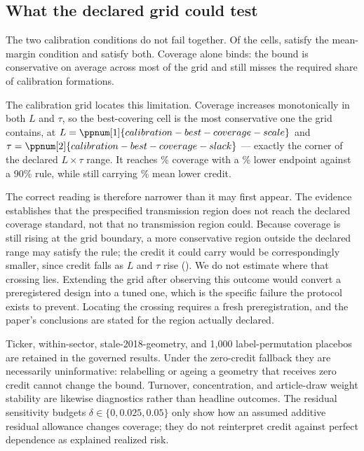 \subsection{What the declared grid could test}\label{sec:calibration-boundary}

The two calibration conditions do not fail together.  Of the
 cells,
 satisfy the mean-margin condition and
 satisfy both.  Coverage alone binds: the
bound is conservative on average across most of the grid and still misses the
required share of calibration formations.

The calibration grid locates this limitation. Coverage
increases monotonically in both $L$ and $\tau$, so the best-covering cell is the
most conservative one the grid contains, at
$L=\ppnum[1]{calibration-best-coverage-scale}$ and
$\tau=\ppnum[2]{calibration-best-coverage-slack}$ --- exactly the corner of the
declared $L\times\tau$ range.  It reaches
\% coverage with a
\% lower endpoint against a 90\%
rule, while still carrying
\% mean lower credit.

The correct reading is therefore narrower than it may first appear.  The
evidence establishes that the prespecified transmission region does not reach
the declared coverage standard, not that no transmission region could.  Because
coverage is still rising at the grid boundary, a more conservative region
outside the declared range may satisfy the rule; the credit it could carry would
be correspondingly smaller, since credit falls as $L$ and $\tau$ rise
(). We do not estimate where
that crossing lies.
Extending the grid after observing this outcome would convert a preregistered
design into a tuned one, which is the specific failure the protocol exists to
prevent.  Locating the crossing requires a fresh preregistration, and the
paper's conclusions are stated for the region actually declared.

Ticker, within-sector, stale-2018-geometry, and 1,000 label-permutation placebos
are retained in the governed results.  Under the zero-credit fallback they are
necessarily uninformative: relabelling or ageing a geometry that receives zero
credit cannot change the bound.  Turnover, concentration, and article-draw
weight stability are likewise diagnostics rather than headline outcomes.  The
residual sensitivity budgets $\delta\in\{0,0.025,0.05\}$ only show how an
assumed additive residual allowance changes coverage; they do not reinterpret
credit against perfect dependence as explained realized risk.
\fi
